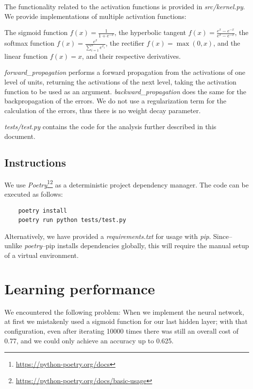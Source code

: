 \documentclass[conference]{IEEEtran}
\begin{document}
The functionality related to the activation functions is provided in \textit{src/kernel.py}. We provide implementations of multiple activation functions: 

The sigmoid function $f(x) = \frac{1}{1+e^{-x}}$, the hyperbolic tangent $f(x) = \frac{e^x-e^{-x}}{e^x-e^{-x}}$, the softmax function
$f(x) = \frac{e^x}{\sum_{i=1}^n e^{x_i}}$, the rectifier $f(x) = \max(0,x)$, and the linear function $f(x) = x$, and their respective derivatives.

\textit{forward\_propagation} performs a forward propagation from the activations of one level of units, returning the activations of the next level, taking the activation function to be used as an argument. \textit{backward\_propagation} does the same for the backpropagation of the errors. We do not use a regularization term for the calculation of the errors, thus there is no weight decay parameter.

\textit{tests/test.py} contains the code for the analysis further described in this document.

\subsection{Instructions}

We use \textit{Poetry}\footnote{\url{https://python-poetry.org/docs}}\footnote{\url{https://python-poetry.org/docs/basic-usage}} as a deterministic project dependency manager. The code can be executed as follows:

\begin{lstlisting}
    poetry install
    poetry run python tests/test.py
\end{lstlisting}

Alternatively, we have provided a \textit{requirements.txt} for usage with \textit{pip}. Since--unlike \textit{poetry}--pip installs dependencies globally, this will require the manual setup of a virtual environment.

\section{Learning performance}

We encountered the following problem: When we implement the neural network, at first we mistakenly used a sigmoid function for our last hidden layer; with that configuration, even after iterating 10000 times there was still an overall cost of 0.77, and we could only achieve an accuracy up to 0.625.
\end{document}
